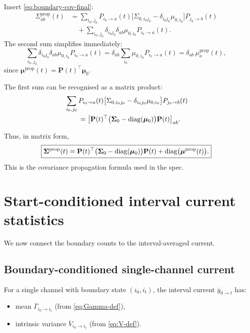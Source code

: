 \documentclass[11pt]{article}
\begin{document}
Insert \eqref{eq:boundary-cov-final}:
\begin{align}
  \Sigma^{\text{prop}}_{ab}(t)
  &=
  \sum_{i_0,j_0}
  P_{i_0\to a}(t)
  \bigl[
    \Sigma_{0,i_0 j_0}
    - \delta_{i_0 j_0}\mu_{0,i_0}
  \bigr]
  P_{j_0\to b}(t)
  \nonumber\\
  &\quad
  +
  \sum_{i_0,j_0}
  \delta_{i_0 j_0}\delta_{ab}
  \mu_{0,i_0}P_{i_0\to a}(t).
\end{align}
The second sum simplifies immediately:
\[
  \sum_{i_0,j_0}
  \delta_{i_0 j_0}\delta_{ab}
  \mu_{0,i_0}P_{i_0\to a}(t)
  =
  \delta_{ab}
  \sum_{i_0}
  \mu_{0,i_0}P_{i_0\to a}(t)
  =
  \delta_{ab}\,\mu^{\text{prop}}_a(t),
\]
since \(\boldsymbol{\mu}^{\text{prop}}(t)=\mathbf{P}(t)^\top\boldsymbol{\mu}_0\).

The first sum can be recognised as a matrix product:
\begin{align}
  &\sum_{i_0,j_0}
  P_{i_0\to a}(t)
  \bigl[
    \Sigma_{0,i_0 j_0}
    - \delta_{i_0 j_0}\mu_{0,i_0}
  \bigr]
  P_{j_0\to b}(t)
  \nonumber\\
  &\qquad =
  \bigl[
    \mathbf{P}(t)^\top
    \bigl(\boldsymbol{\Sigma}_0-\operatorname{diag}(\boldsymbol{\mu}_0)\bigr)
    \mathbf{P}(t)
  \bigr]_{ab}.
\end{align}

Thus, in matrix form,
\[
  \boxed{
    \boldsymbol{\Sigma}^{\text{prop}}(t)
    =
    \mathbf{P}(t)^\top
    \bigl(\boldsymbol{\Sigma}_0-\operatorname{diag}(\boldsymbol{\mu}_0)\bigr)
    \mathbf{P}(t)
    +
    \operatorname{diag}\bigl(\boldsymbol{\mu}^{\text{prop}}(t)\bigr).
  }
\]
This is the covariance propagation formula used in the spec.


\section{Start-conditioned interval current statistics}

We now connect the boundary counts to the interval-averaged current.

\subsection{Boundary-conditioned single-channel current}

For a single channel with boundary state \((i_0,i_t)\), the interval current
\(\overline{y}_{0\to t}\) has:
\begin{itemize}
  \item mean \(\overline{\Gamma}_{i_0\to i_t}\) (from \eqref{eq:Gamma-def}),
  \item intrinsic variance \(\overline{V}_{i_0\to i_t}\) (from \eqref{eq:V-def}).
\end{itemize}
\end{document}
